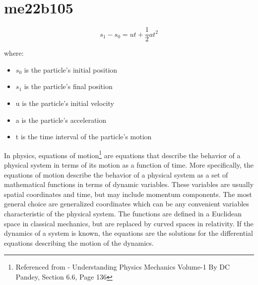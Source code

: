 \section{me22b105}

\[ s_1-s_0 = ut + \frac{1}{2}at^2 \]

where:
\begin{itemize}
    \item $s_0$ is the particle's initial position
    \item $s_1$ is the particle's final position
    \item u is the particle's initial velocity
    \item a is the particle's acceleration
    \item t is the time interval of the particle's motion
\end{itemize}

In physics, equations of motion\footnote{Referenced from - Understanding Physics Mechanics Volume-1 By DC Pandey, Section 6.6, Page 136} are equations that describe the behavior of a physical system in terms of its motion as a function of time. More specifically, the equations of motion describe the behavior of a physical system as a set of mathematical functions in terms of dynamic variables. These variables are usually spatial coordinates and time, but may include momentum components. The most general choice are generalized coordinates which can be any convenient variables characteristic of the physical system. The functions are defined in a Euclidean space in classical mechanics, but are replaced by curved spaces in relativity. If the dynamics of a system is known, the equations are the solutions for the differential equations describing the motion of the dynamics.




\begin{flushleft}

\end{flushleft}

